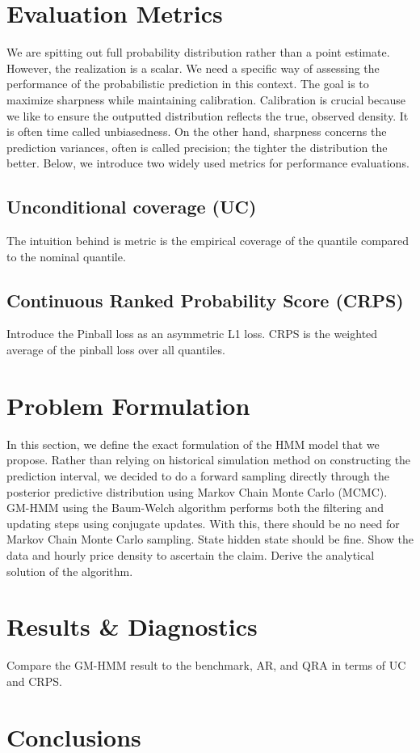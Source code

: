 \documentclass[11pt, letterpaper, journal]{IEEEtran}
\begin{document}
\section{Evaluation Metrics}
We are spitting out full probability distribution rather than a point estimate. However, the realization is a scalar. We need a specific way of assessing the performance of the probabilistic prediction in this context. The goal is to maximize sharpness while maintaining calibration. Calibration is crucial because we like to ensure the outputted distribution reflects the true, observed density. It is often time called unbiasedness. On the other hand, sharpness concerns the prediction variances, often is called precision; the tighter the distribution the better. Below, we introduce two widely used metrics for performance evaluations.

\subsection{Unconditional coverage (UC)}
The intuition behind is metric is the empirical coverage of the quantile compared to the nominal quantile.

\subsection{Continuous Ranked Probability Score (CRPS)}
Introduce the Pinball loss as an asymmetric L1 loss.
CRPS is the weighted average of the pinball loss over all quantiles.


\section{Problem Formulation}
In this section, we define the exact formulation of the HMM model that we propose. Rather than relying on historical simulation method on constructing the prediction interval, we decided to do a forward sampling directly through the posterior predictive distribution using Markov Chain Monte Carlo (MCMC). GM-HMM using the Baum-Welch algorithm performs both the filtering and updating steps using conjugate updates. With this, there should be no need for Markov Chain Monte Carlo sampling. State hidden state should be fine. Show the data and hourly price density to ascertain the claim. Derive the analytical solution of the algorithm.


\section{Results \& Diagnostics}
Compare the GM-HMM result to the benchmark, AR, and QRA in terms of UC and CRPS.

\section{Conclusions}

\printbibliography[heading=bibintoc, title={References}]
\end{document}
